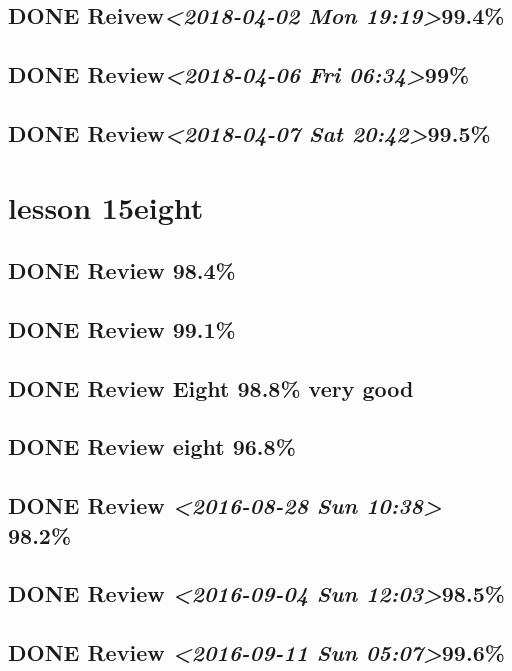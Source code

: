 \documentclass[11pt]{ctexart}
\begin{document}
\subsection{{\bfseries\sffamily DONE} Reivew\textit{<2018-04-02 Mon 19:19>}99.4\%}
\label{sec:org2c998dc}
\subsection{{\bfseries\sffamily DONE} Review\textit{<2018-04-06 Fri 06:34>}99\%}
\label{sec:org8b0354c}
\subsection{{\bfseries\sffamily DONE} Review\textit{<2018-04-07 Sat 20:42>}99.5\%}
\label{sec:org8ae0845}
\section{lesson 15eight}
\label{sec:org5f97c4e}
\subsection{{\bfseries\sffamily DONE} Review 98.4\%}
\label{sec:orgb56d6a4}
\subsection{{\bfseries\sffamily DONE} Review 99.1\%}
\label{sec:org255ee5b}
\subsection{{\bfseries\sffamily DONE} Review Eight 98.8\% very good}
\label{sec:org5c3022a}
\subsection{{\bfseries\sffamily DONE} Review eight 96.8\%}
\label{sec:orgce10069}

\subsection{{\bfseries\sffamily DONE} Review \textit{<2016-08-28 Sun 10:38> } 98.2\%}
\label{sec:orgbf0feba}
\subsection{{\bfseries\sffamily DONE} Review \textit{<2016-09-04 Sun 12:03>}98.5\%}
\label{sec:org8619371}
\subsection{{\bfseries\sffamily DONE} Review \textit{<2016-09-11 Sun 05:07>}99.6\%}
\label{sec:org3f272b2}
\end{document}
